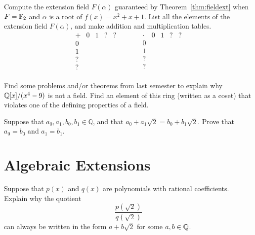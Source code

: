 \begin{problem}
    Compute the extension field $F(\alpha)$ guaranteed by Theorem~\ref{thm:fieldext} when $F = \mathbb{F}_2$ and $\alpha$ is a root of $f(x)=x^2+x+1$. List all the elements of the extension field $F(\alpha)$, and make addition and multiplication tables.
\[
\begin{array}{c|cccc}
+   & 0   & 1  & ? & ? \\ \hline
0   &     &    &   &   \\
1   &     &    &   &   \\
?   &     &    &   &   \\
?   &     &    &   &   \\
\end{array}
\quad\quad\quad
\begin{array}{c|cccc}
\cdot & 0   & 1  & ? & ? \\ \hline
0     &     &    &   &   \\
1     &     &    &   &   \\
?     &     &    &   &   \\
?     &     &    &   &   \\
\end{array}
\]
\end{problem}

\begin{problem}
    Find some problems and/or theorems from last semester to explain why $\mathbb{Q}[x]/(x^4-9)$ is not a field. Find an element of this ring (written as a coset) that violates one of the defining properties of a field.
\end{problem}

\begin{problem}\label{prob:root2a}
Suppose that $a_0, a_1, b_0, b_1 \in \mathbb{Q}$, and that $a_0 + a_1\sqrt{2} = b_0+b_1\sqrt{2}$.  Prove that $a_0 = b_0$ and $a_1 = b_1$.
\begin{annotation}
\end{annotation}
\end{problem}

\section{Algebraic Extensions}

\begin{problem}\label{prob:root2b}
Suppose that $p(x)$ and $q(x)$ are polynomials with rational coefficients. Explain why the quotient
$$\frac{p\left(\sqrt{2}\right)}{q\left(\sqrt{2}\right)}$$ can always be written in the form $a + b\sqrt{2}$ for some $a,b \in \mathbb{Q}$.
\end{problem}

